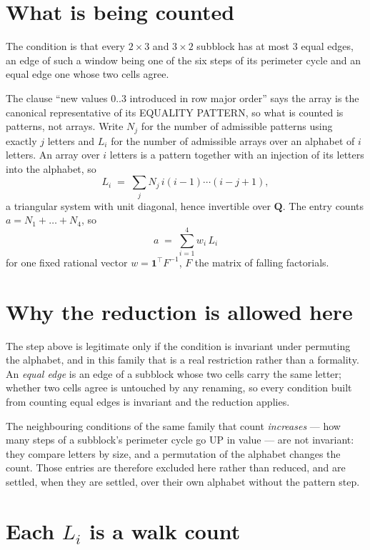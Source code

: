\documentclass[11pt,a4paper]{article}
\theoremstyle{plain}
\theoremstyle{definition}
\begin{document}
\section{What is being counted}

The condition is that every $2\times3$ and $3\times2$ subblock has at most $3$ equal edges, an edge of such a window being one of the six steps of its perimeter cycle and an equal edge one whose two cells agree.

The clause ``new values $0..3$ introduced in row major order'' says the array is the
canonical representative of its EQUALITY PATTERN, so what is counted is patterns, not arrays.
Write $N_j$ for the number of admissible patterns using exactly $j$ letters and $L_i$ for the
number of admissible arrays over an alphabet of $i$ letters. An array over $i$ letters is a
pattern together with an injection of its letters into the alphabet, so
\[
L_i\;=\;\sum_j N_j\,i(i-1)\cdots(i-j+1),
\]
a triangular system with unit diagonal, hence invertible over $\mathbf{Q}$. The entry counts
$a=N_1+\dots+N_{4}$, so
\[
a\;=\;\sum_{i=1}^{4}w_i\,L_i
\]
for one fixed rational vector $w=\mathbf{1}^{\!\top}F^{-1}$, $F$ the matrix of falling
factorials.

\section{Why the reduction is allowed here}

The step above is legitimate only if the condition is invariant under permuting the alphabet,
and in this family that is a real restriction rather than a formality. An \emph{equal edge}
is an edge of a subblock whose two cells carry the same letter; whether two cells agree is
untouched by any renaming, so every condition built from counting equal edges is invariant and
the reduction applies.

The neighbouring conditions of the same family that count \emph{increases} --- how many steps
of a subblock's perimeter cycle go UP in value --- are not invariant: they compare letters by
size, and a permutation of the alphabet changes the count. Those entries are therefore excluded
here rather than reduced, and are settled, when they are settled, over their own alphabet
without the pattern step.

\section{Each $L_i$ is a walk count}
\end{document}
